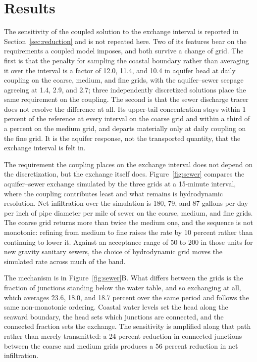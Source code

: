 \documentclass[preprint,authoryear,11pt]{elsarticle}
\begin{document}
\section{Results}

The sensitivity of the coupled solution to the exchange interval is reported in Section~\ref{sec:reduction} and is not repeated here. Two of its features bear on the requirements a coupled model imposes, and both survive a change of grid. The first is that the penalty for sampling the coastal boundary rather than averaging it over the interval is a factor of 12.0, 11.4, and 10.4 in aquifer head at daily coupling on the coarse, medium, and fine grids, with the aquifer--sewer seepage agreeing at 1.4, 2.9, and 2.7; three independently discretized solutions place the same requirement on the coupling. The second is that the sewer discharge tracer does not resolve the difference at all. Its upper-tail concentration stays within 1 percent of the reference at every interval on the coarse grid and within a third of a percent on the medium grid, and departs materially only at daily coupling on the fine grid. It is the aquifer response, not the transported quantity, that the exchange interval is felt in.

The requirement the coupling places on the exchange interval does not depend on the discretization, but the exchange itself does. Figure~\ref{fig:sewer} compares the aquifer--sewer exchange simulated by the three grids at a 15-minute interval, where the coupling contributes least and what remains is hydrodynamic resolution. Net infiltration over the simulation is 180, 79, and 87 gallons per day per inch of pipe diameter per mile of sewer on the coarse, medium, and fine grids. The coarse grid returns more than twice the medium one, and the sequence is not monotonic: refining from medium to fine raises the rate by 10 percent rather than continuing to lower it. Against an acceptance range of 50 to 200 in those units for new gravity sanitary sewers, the choice of hydrodynamic grid moves the simulated rate across much of the band.

The mechanism is in Figure~\ref{fig:sewer}B. What differs between the grids is the fraction of junctions standing below the water table, and so exchanging at all, which averages 23.6, 18.0, and 18.7 percent over the same period and follows the same non-monotonic ordering. Coastal water levels set the head along the seaward boundary, the head sets which junctions are connected, and the connected fraction sets the exchange. The sensitivity is amplified along that path rather than merely transmitted: a 24 percent reduction in connected junctions between the coarse and medium grids produces a 56 percent reduction in net infiltration.
\end{document}
